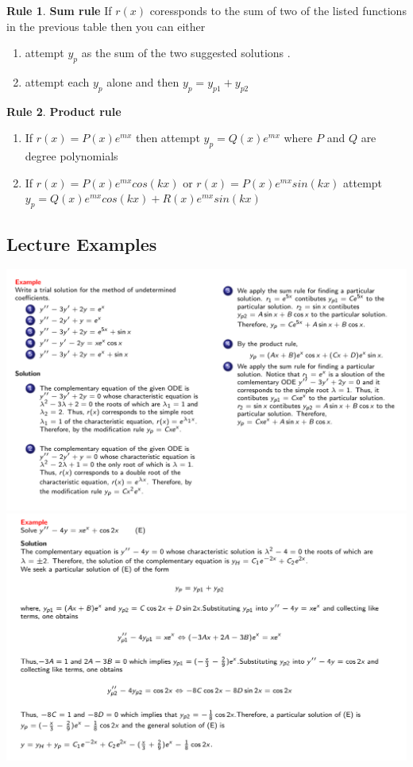 \documentclass[11pt]{article}
\theoremstyle{definition}
\newtheorem{reg}{Rule}
\begin{document}
\begin{reg}
\textbf{Sum rule}
If $r(x)$ coressponds to the sum of two of the listed functions in the previous table then you can either \begin{enumerate}
    \item attempt $y_p$ as the sum of the two suggested solutions .
    \item attempt each $y_p$ alone and then $y_p = y_{p1} + y_{p2}$
\end{enumerate}
\end{reg}
\begin{reg}
\textbf{Product rule}
\begin{enumerate}
    \item If $r(x) = P(x) e^{mx}$ then attempt $y_p = Q(x) e^{mx}$  where $P$ and $Q$ are degree polynomials
    \item If $r(x) = P(x) e^{mx} cos(kx)$ or $r(x) = P(x) e^{mx} sin(kx)$ attempt $y_p = Q(x) e^{mx} cos(kx) + R(x) e^{mx} sin(kx)$
\end{enumerate}
\end{reg}
\subsection{Lecture Examples}
\begin{center}
    \includegraphics[scale =0.4]{images/exs.png}
    \includegraphics[scale =0.4]{images/ex.png}
\end{center}
\end{document}
